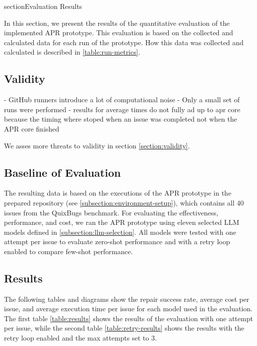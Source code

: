section{Evaluation Results} \label{section:evaluation-results}

In this section, we present the results of the quantitative evaluation of the implemented APR prototype. This evaluation is based on the collected and calculated data for each run of the prototype. How this data was collected and calculated is described in \ref{table:run-metrics}.

\subsection{Validity}

- GitHub runners introduce a lot of computational noise
- Only a small set of runs were performed
- results for average times do not fully ad up to apr core because the timing where stoped when an issue was completed not when the APR core finished 

We asses more threats to validity in section \ref{section:validity}.

\subsection{Baseline of Evaluation}

The resulting data is based on the executions of the APR prototype in the prepared repository (see \ref{subsection:environment-setup}), which contains all 40 issues from the QuixBugs benchmark. For evaluating the effectiveness, performance, and cost, we ran the APR prototype using eleven selected LLM models defined in \ref{subsection:llm-selection}. All models were tested with one attempt per issue to evaluate zero-shot performance and with a retry loop enabled to compare few-shot performance.

\subsection{Results}

The following tables and diagrams show the repair success rate, average cost per issue, and average execution time per issue for each model used in the evaluation. The first table \ref{table:results} shows the results of the evaluation with one attempt per issue, while the second table \ref{table:retry-results} shows the results with the retry loop enabled and the max attempts set to 3.

